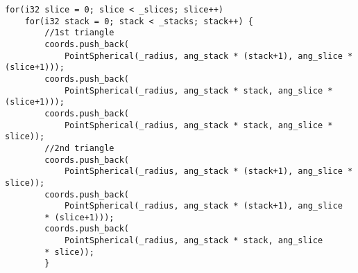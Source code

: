 \begin{lstlisting}
for(i32 slice = 0; slice < _slices; slice++)
    for(i32 stack = 0; stack < _stacks; stack++) {
        //1st triangle
        coords.push_back(
            PointSpherical(_radius, ang_stack * (stack+1), ang_slice * (slice+1)));
        coords.push_back(
            PointSpherical(_radius, ang_stack * stack, ang_slice * (slice+1)));
        coords.push_back(
            PointSpherical(_radius, ang_stack * stack, ang_slice * slice));
        //2nd triangle
        coords.push_back(
            PointSpherical(_radius, ang_stack * (stack+1), ang_slice * slice));
        coords.push_back(
            PointSpherical(_radius, ang_stack * (stack+1), ang_slice
        * (slice+1)));
        coords.push_back(
            PointSpherical(_radius, ang_stack * stack, ang_slice
        * slice));
        }
\end{lstlisting}
